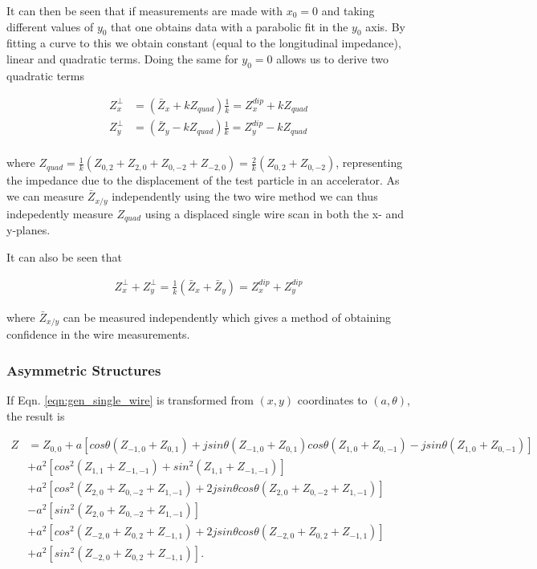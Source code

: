 \documentclass[12pt,a4paper,twopage,openright]{article}
\begin{document}
It can then be seen that if measurements are made with $x_{0} = 0$ and taking different values of $y_{0}$ that one obtains data with a parabolic fit in the $y_{0}$ axis. By fitting a curve to this we obtain constant (equal to the longitudinal impedance), linear and quadratic terms. Doing the same for $y_{0}=0$ allows us to derive two quadratic terms

\begin{align}
Z^{\perp}_{x} & = \left( \bar{Z}_{x} + kZ_{quad} \right)\frac{1}{k} =  Z^{dip}_{x} + kZ_{quad}\\
Z^{\perp}_{y} & = \left( \bar{Z}_{y} - kZ_{quad} \right)\frac{1}{k}= Z^{dip}_{y} - kZ_{quad} \\
\end{align}

where $Z_{quad}=\frac{1}{k}\left( Z_{0,2}+Z_{2,0}+Z_{0,-2}+Z_{-2,0}  \right) = \frac{2}{k}\left( Z_{0,2}+Z_{0,-2}  \right)$, representing the impedance due to the displacement of the test particle in an accelerator. As we can measure $\bar{Z}_{x/y}$ independently using the two wire method we can thus indepedently measure $Z_{quad}$ using a displaced single wire scan in both the x- and y-planes.

It can also be seen that

\begin{align}
Z^{\perp}_{x} + Z^{\perp}_{y} = \frac{1}{k}\left( \bar{Z}_{x} + \bar{Z}_{y} \right) = Z^{dip}_{x} + Z^{dip}_{y}
\end{align}

where $\bar{Z}_{x/y}$ can be measured independently which gives a method of obtaining confidence in the wire measurements.

\subsubsection{Asymmetric Structures}

If Eqn. \ref{eqn:gen_single_wire} is transformed from $\left( x,y \right)$ coordinates to $\left( a, \theta \right)$, the result is

\begin{align}
Z &=Z_{0,0} +a\left[ cos\theta \left( Z_{-1,0} + Z_{0,1} \right) +jsin\theta \left( Z_{-1,0} + Z_{0,1} \right)  cos\theta \left( Z_{1,0} + Z_{0,-1} \right) - jsin\theta \left( Z_{1,0} + Z_{0,-1} \right)\right] \nonumber \\
   &+a^{2}\left[ cos^{2} \left( Z_{1,1} + Z_{-1,-1} \right) + sin^{2} \left( Z_{1,1} + Z_{-1,-1} \right)\right] \nonumber \\
   &+a^{2}\left[ cos^{2} \left( Z_{2,0} + Z_{0,-2} +Z_{1,-1} \right) +2jsin\theta cos\theta\left( Z_{2,0} + Z_{0,-2} +Z_{1,-1} \right) \right] \nonumber \\
   & - a^{2}\left[sin^{2} \left( Z_{2,0} + Z_{0,-2} +Z_{1,-1} \right)\right] \nonumber  \\
   &+ a^{2}\left[ cos^{2} \left( Z_{-2,0} + Z_{0,2} +Z_{-1,1} \right) +2jsin\theta cos\theta\left( Z_{-2,0} + Z_{0,2} +Z_{-1,1}  \right) \right] \nonumber \\
   &+ a^{2}\left[sin^{2} \left( Z_{-2,0} + Z_{0,2} +Z_{-1,1}  \right) \right].
\end{align}
\end{document}
